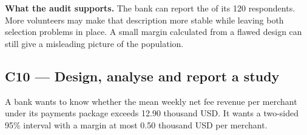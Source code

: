 \textbf{What the audit supports.} The bank can report the  of its 120 respondents. More volunteers may make that description more stable while leaving both selection problems in place. A small margin calculated from a flawed design can still give a misleading picture of the population.
\par\nobreak
{}

\clearpage
\subsection{C10 --- Design, analyse and report a study}\label{crit:c10}

 A bank wants to know whether the mean weekly net fee revenue per merchant under its payments package exceeds 12.90 thousand USD. It wants a two-sided 95\% interval with a margin at most 0.50 thousand USD per merchant.

